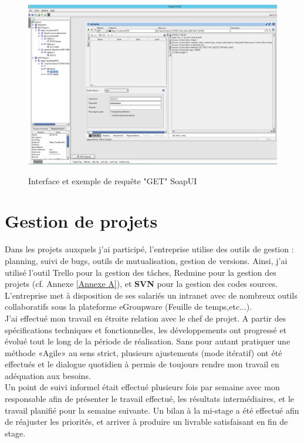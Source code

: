 \begin{center}
\begin{figure}[h] \centering
\includegraphics[width=16cm]{images/soapUI_getById_sansResponse_small.png}\\
\caption{\label{SoapUIGet} Interface et exemple de requête "GET" SoapUI}
\end{figure}
\end{center}


\section{Gestion de projets}

Dans les projets auxquels j'ai participé, l'entreprise utilise des outils de gestion : planning, suivi de bugs, outils de mutualisation, gestion de versions. Ainsi, j'ai utilisé l'outil Trello pour la gestion des tâches, Redmine pour la gestion des projets (cf. Annexe \ref{Annexe A}), et \textbf{SVN} pour la gestion des codes sources. L'entreprise met à disposition de ses salariés un intranet avec de nombreux outils collaboratifs sous la plateforme eGroupware (Feuille de temps,etc...).\\

J'ai effectué mon travail en étroite relation avec le chef de projet. A partir des spécifications techniques et fonctionnelles, les développements ont progressé et évolué tout le long de la période de réalisation. Sans pour autant pratiquer une méthode «Agile» au sens strict, plusieurs ajustements (mode itératif) ont été effectués et le dialogue quotidien à permis de toujours rendre mon travail en adéquation aux besoins. \\

Un point de suivi informel était effectué plusieurs fois par semaine avec mon responsable afin de présenter le travail effectué, les résultats intermédiaires, et le travail planifié pour la semaine suivante. Un bilan à la mi-stage a été effectué afin de réajuster les priorités, et arriver à produire un livrable satisfaisant en fin de stage. \\


